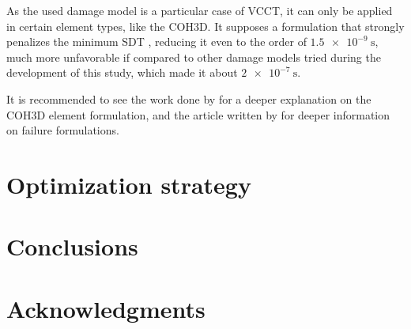\documentclass[cmfonts]{witpress}
\begin{document}
As the used damage model is a particular case of VCCT, it can only be applied in certain element types, like the COH3D. It supposes a formulation that strongly penalizes the minimum SDT \cite{Abaqus613Manual}, reducing it even to the order of $\SI{1.5e-9}{\s}$, much more unfavorable if compared to other damage models tried during the development of this study, which made it about $\SI{2e-7}{\s}$.

It is recommended to see the work done by \cite{Alfano2001} for a deeper explanation on the COH3D element formulation, and the article written by \cite{May2014} for deeper information on failure formulations.
\section{Optimization strategy}
\section{Conclusions}
\section{Acknowledgments}




\end{document}
